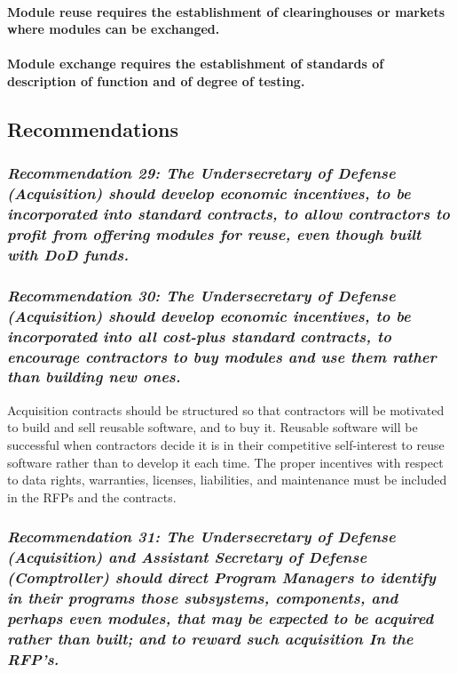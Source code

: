 \documentclass[12pt,final]{article}
\begin{document}
\paragraph{Module reuse requires the establishment of clearinghouses or markets where
modules can be exchanged.}

\paragraph{Module exchange requires the establishment of standards of description of
function and of degree of testing.}

\subsection*{Recommendations}

\label{rec:29}
\subsubsection*{\textit{Recommendation 29: The Undersecretary of Defense
(Acquisition) should develop economic incentives, to be incorporated into
standard contracts, to allow contractors to profit from offering modules for
reuse, even though built with DoD funds.}}

\label{rec:30}
\subsubsection*{\textit{Recommendation 30: The Undersecretary of Defense
(Acquisition) should develop economic incentives, to be incorporated into all
cost-plus standard contracts, to encourage contractors to buy modules and use
them rather than building new ones.}}

Acquisition contracts should be structured so that contractors will be
motivated to build and sell reusable software, and to buy it. Reusable software
will be successful when contractors decide it is in their competitive
self-interest to reuse software rather than to develop it each time. The proper
incentives with respect to data rights, warranties, licenses, liabilities, and
maintenance must be included in the RFPs and the contracts.

\label{rec:31}
\subsubsection*{\textit{Recommendation 31: The Undersecretary of Defense
(Acquisition) and Assistant Secretary of Defense (Comp\-troller) should direct
Program Managers to identify in their programs those subsystems, components,
and perhaps even modules, that may be expected to be acquired rather than
built; and to reward such acquisition In the RFP’s.}}
\end{document}
